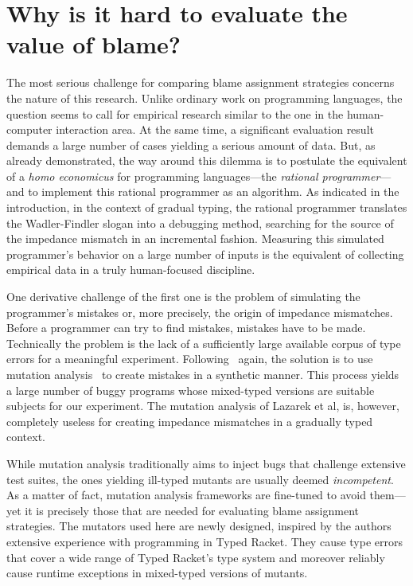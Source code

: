 
\section{Why is it hard to evaluate the value of blame?}
\label{sec:challenges}

The most serious challenge for comparing blame assignment strategies concerns 
the nature of this research. Unlike ordinary
work on programming languages, the question seems to call for empirical research
similar to the one in the human-computer interaction area. At the same time, a
significant evaluation result demands a large number of cases yielding a serious
amount of data. But, as~\citet{lksfd-popl-2020} already demonstrated, the way
around this dilemma is to postulate the equivalent of a {\it homo economicus\/}
for programming languages---the {\em rational programmer\/}---and to implement
this rational programmer as an algorithm.  As indicated in the introduction, in
the context of gradual typing, the rational programmer translates the
Wadler-Findler slogan into a debugging method, searching for the source of the
impedance mismatch in an incremental fashion. Measuring this simulated
programmer's behavior on a large number of inputs is the equivalent of
collecting empirical data in a truly human-focused discipline. 

One derivative challenge of the first one is the problem of simulating the
programmer's mistakes or, more precisely, the origin of impedance
mismatches. Before a programmer can try to find mistakes, mistakes have to
be made. Technically the problem is the lack of a sufficiently large
available corpus of type errors for a meaningful experiment.
Following~\citet{lksfd-popl-2020} again, the solution is to use mutation
analysis~\cite{lipton1971fault, demillo1978hints, jia2011analysis} to
create mistakes in a synthetic manner. This process yields a large number
of buggy programs whose mixed-typed versions are suitable subjects for our
experiment.  The mutation analysis of Lazarek et al, is, however,
completely useless for creating impedance mismatches in a gradually
typed context.

While mutation analysis traditionally aims to inject bugs that challenge
extensive test suites, the ones yielding ill-typed mutants are usually deemed
\emph{incompetent}. As a matter of fact, mutation analysis frameworks are
fine-tuned to avoid them---yet it is precisely those that are needed for
evaluating blame assignment strategies. The mutators used here are newly designed,
inspired by the authors extensive experience with programming in Typed Racket.
They cause type errors that cover a wide range of Typed Racket's type system and moreover
reliably cause runtime exceptions in mixed-typed versions of mutants.

